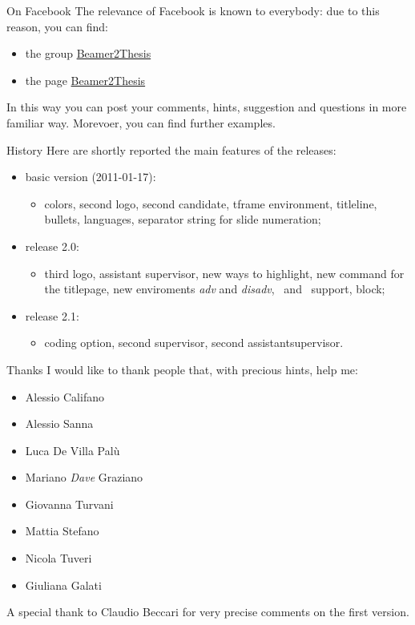 \begin{tframe}{On Facebook}
The relevance of Facebook is known to everybody: due to this reason, you can find:
\begin{itemize}
\item the group \href{https://www.facebook.com/\#!/groups/beamer2thesis/}{Beamer2Thesis}
\item the page \href{https://www.facebook.com/\#!/pages/Beamer2Thesis/112814205489099}{Beamer2Thesis}
\end{itemize} 
In this way you can post your comments, hints, suggestion and questions in more familiar way. Morevoer, you can find further examples.
\end{tframe}

\begin{tframe}{History}
Here are shortly reported the main features of the releases:
\begin{itemize}
\item basic version (2011-01-17):
\begin{itemize}
\item colors, second logo, second candidate, tframe environment, titleline, bullets, languages, separator string for slide numeration; 
\end{itemize}
\item release 2.0:
\begin{itemize}
\item third logo, assistant supervisor, new ways to highlight, new command for the titlepage, new enviroments \emph{adv} and \emph{disadv}, \XeTeX\, and \XeLaTeX\, support, block;
\end{itemize}
\item release 2.1:
\begin{itemize}
\item coding option, second supervisor, second assistantsupervisor.
\end{itemize}
\end{itemize}
\end{tframe}

\begin{tframe}{Thanks}
I would like to thank people that, with precious hints, help me:
\begin{itemize}
\item Alessio Califano
\item Alessio Sanna
\item Luca De Villa Palù
\item Mariano \emph{Dave} Graziano
\item Giovanna Turvani
\item Mattia Stefano
\item Nicola Tuveri
\item Giuliana Galati
\end{itemize}
A special thank to Claudio Beccari for very precise comments on the first version.
\end{tframe}

